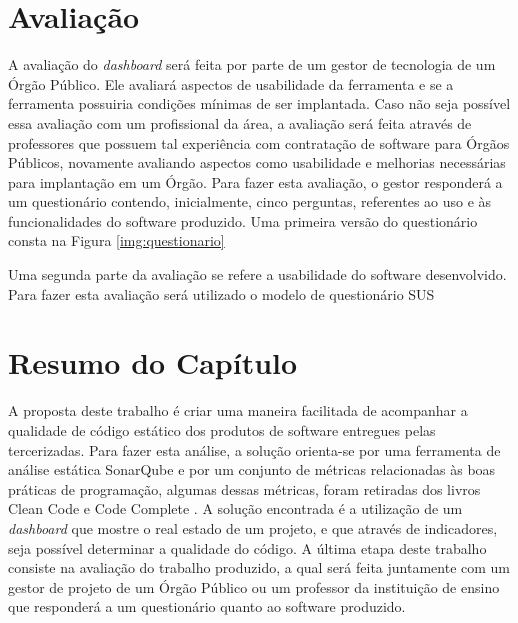\section{Avaliação}
A avaliação do \textit{dashboard} será feita por parte de um gestor de tecnologia de um Órgão Público. Ele avaliará aspectos de usabilidade da ferramenta e se a ferramenta possuiria condições mínimas de ser implantada. Caso não seja possível essa avaliação com um profissional da área, a avaliação será feita através de professores que possuem tal experiência com contratação de software para Órgãos Públicos, novamente avaliando aspectos como usabilidade e melhorias necessárias para implantação em um Órgão.
Para fazer esta avaliação, o gestor responderá a um questionário contendo, inicialmente, cinco perguntas, referentes ao uso e às funcionalidades do software produzido. Uma primeira versão do questionário consta na Figura \ref{img:questionario}

Uma segunda parte da avaliação se refere a usabilidade do software desenvolvido. Para fazer esta avaliação será utilizado o modelo de questionário SUS

\section{Resumo do Capítulo}
A proposta deste trabalho é criar uma maneira facilitada de acompanhar a qualidade de código estático dos produtos de software entregues pelas tercerizadas. Para fazer esta análise, a solução orienta-se por uma ferramenta de análise estática SonarQube e por um conjunto de métricas relacionadas às boas práticas de programação, algumas dessas métricas, foram retiradas dos livros Clean Code \cite{martin2009clean} e Code Complete \cite{mcconnell2004code}. A solução encontrada é a utilização de um \textit{dashboard} que mostre o real estado de um projeto, e que através de indicadores, seja possível determinar a qualidade do código. A última etapa deste trabalho consiste na avaliação do trabalho produzido, a qual será feita juntamente com um gestor de projeto de um Órgão Público ou um professor da instituição de ensino que responderá a um questionário quanto ao software produzido.